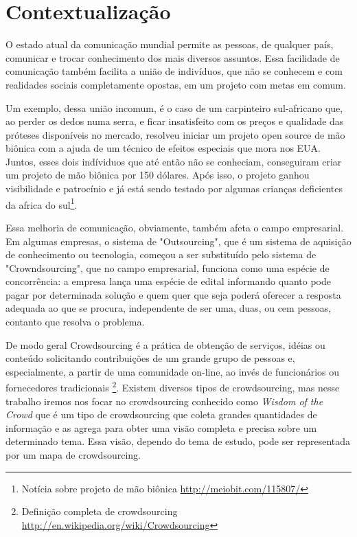 \section{Contextualização}
O estado atual da comunicação mundial permite as pessoas, de qualquer país, comunicar e trocar conhecimento dos mais diversos assuntos. Essa facilidade de comunicação também facilita a união de indivíduos, que não se conhecem e com realidades sociais completamente opostas, em um projeto com metas em comum.

Um exemplo, dessa união incomum, é o caso de um carpinteiro sul-africano que, ao perder os dedos numa serra, e ficar insatisfeito com os preços e qualidade das próteses disponíveis no mercado, resolveu iniciar um projeto open source de mão biônica com a ajuda de um técnico de efeitos especiais que mora nos EUA. Juntos, esses dois indíviduos que até então não se conheciam, conseguiram criar um projeto de mão biônica por 150 dólares. Após isso, o projeto ganhou visibilidade e patrocínio e já está sendo testado por algumas crianças deficientes da africa do sul\footnote{\label{maobionica} Notícia sobre projeto de mão biônica \url{http://meiobit.com/115807/}}.

Essa melhoria de comunicação, obviamente, também  afeta o campo empresarial. Em algumas empresas, o sistema de "Outsourcing", que é um sistema de aquisição de conhecimento ou tecnologia, começou a ser substituído pelo sistema de "Crowndsourcing", que no campo empresarial, funciona como uma espécie de concorrência: a empresa lança uma espécie de edital informando quanto pode pagar por determinada solução e quem quer que seja poderá oferecer a resposta adequada ao que se procura, independente de ser uma, duas, ou cem pessoas, contanto que resolva o problema.

De modo geral Crowdsourcing é a prática de obtenção de serviços, idéias ou conteúdo solicitando contribuições de um grande grupo de pessoas e, especialmente, a partir de uma comunidade on-line, ao invés de funcionários ou fornecedores tradicionais \footnote{\label{wiki-crowd} Definição completa de crowdsourcing \url{ http://en.wikipedia.org/wiki/Crowdsourcing}}.
Existem diversos tipos de crowdsourcing, mas nesse trabalho iremos nos focar no crowdsourcing conhecido como \emph{Wisdom of the Crowd} que é um tipo de crowdsourcing que coleta grandes quantidades de informação e as agrega para obter uma visão completa e precisa sobre um determinado tema. Essa visão, dependo do tema de estudo, pode ser representada por um mapa de crowdsourcing.

